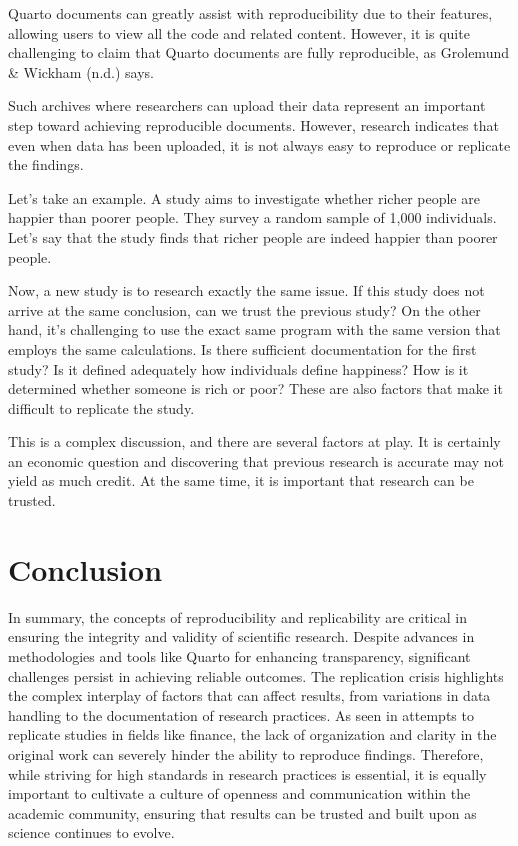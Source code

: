 \documentclass[
  a4paper,
]{article}
\begin{document}
Quarto documents can greatly assist with reproducibility due to their
features, allowing users to view all the code and related content.
However, it is quite challenging to claim that Quarto documents are
fully reproducible, as Grolemund \& Wickham (n.d.) says.

Such archives where researchers can upload their data represent an
important step toward achieving reproducible documents. However,
research indicates that even when data has been uploaded, it is not
always easy to reproduce or replicate the findings.

Let's take an example. A study aims to investigate whether richer people
are happier than poorer people. They survey a random sample of 1,000
individuals. Let's say that the study finds that richer people are
indeed happier than poorer people.

Now, a new study is to research exactly the same issue. If this study
does not arrive at the same conclusion, can we trust the previous study?
On the other hand, it's challenging to use the exact same program with
the same version that employs the same calculations. Is there sufficient
documentation for the first study? Is it defined adequately how
individuals define happiness? How is it determined whether someone is
rich or poor? These are also factors that make it difficult to replicate
the study.

This is a complex discussion, and there are several factors at play. It
is certainly an economic question and discovering that previous research
is accurate may not yield as much credit. At the same time, it is
important that research can be trusted.

\section{Conclusion}\label{conclusion}

In summary, the concepts of reproducibility and replicability are
critical in ensuring the integrity and validity of scientific research.
Despite advances in methodologies and tools like Quarto for enhancing
transparency, significant challenges persist in achieving reliable
outcomes. The replication crisis highlights the complex interplay of
factors that can affect results, from variations in data handling to the
documentation of research practices. As seen in attempts to replicate
studies in fields like finance, the lack of organization and clarity in
the original work can severely hinder the ability to reproduce findings.
Therefore, while striving for high standards in research practices is
essential, it is equally important to cultivate a culture of openness
and communication within the academic community, ensuring that results
can be trusted and built upon as science continues to evolve.
\end{document}
